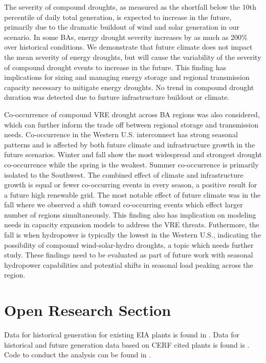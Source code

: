 \documentclass{agujournal2019}
\begin{document}
The severity of compound droughts, as measured as the shortfall below the 10th percentile of daily total generation, is expected to increase in the future, primarily due to the dramatic buildout of wind and solar generation in our scenario. In some BAs, energy drought severity increases by as much as 200\% over historical conditions. We demonstrate that future climate does not impact the mean severity of energy droughts, but will cause the variability of the severity of compound drought events to increase in the future. This finding has implications for sizing and managing energy storage and regional transmission capacity necessary to mitigate energy droughts. No trend in compound drought duration was detected due to furture infrastructure buildout or climate. 

Co-occurrence of compound VRE drought across BA regions was also considered, which can further inform the trade off between regional storage and transmission needs. Co-occurrence in the Western U.S. interconnect has strong seasonal patterns and is affected by both future climate and infrastructure growth in the future scenarios. Winter and fall show the most widespread and strongest drought co-occurrence while the spring is the weakest. Summer co-occurrence is primarily isolated to the Southwest. The combined effect of climate and infrastructure growth is equal or fewer co-occurring events in every season, a positive result for a future high renewable grid. The most notable effect of future climate was in the fall where we observed a shift toward co-occurring events which effect larger number of regions simultaneously. This finding also has implication on modeling needs in capacity expansion models to address the VRE threats. Futhermore, the fall is when hydropower is typically the lowest in the Western U.S., indicating the possibility of compound wind-solar-hydro droughts, a topic which needs further study. These findings need to be evaluated as part of future work with seasonal hydropower capabilities and potential shifts in seasonal load peaking across the region. 

 


%
%

\section*{Open Research Section}
Data for historical generation for existing EIA plants is found in . Data for historical and future generation data based on CERF cited plants is found is . Code to conduct the analysis can be found in .
\end{document}
